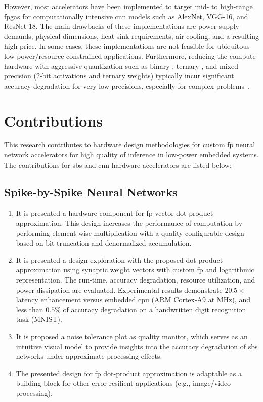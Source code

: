 \begin{itemize}
However, most accelerators have been implemented to target mid- to high-range \glspl{fpga} for computationally intensive \gls{cnn} models such as AlexNet, VGG-16, and ResNet-18. The main drawbacks of these implementations are power supply demands, physical dimensions, heat sink requirements, air cooling, and a resulting high price. In some cases, these implementations are not feasible for ubiquitous low-power/resource-constrained applications. Furthermore, reducing the compute hardware with aggressive quantization such as binary \cite{courbariaux2015binaryconnect}, ternary \cite{lin2015neural}, and mixed precision (2-bit activations and ternary weights) \cite{colangelo2018exploration} typically incur significant accuracy degradation for very low precisions, especially for complex problems~\cite{faraone2019addnet}.

\end{itemize}

\section{Contributions}
This research contributes to hardware design methodologies for custom \gls{fp} neural network accelerators for high quality of inference in
 low-power embedded systems. The contributions for \gls{sbs} and \gls{cnn} hardware accelerators are listed below:

\subsection{Spike-by-Spike Neural Networks}
\begin{enumerate}
	\item It is presented a hardware component for \gls{fp} vector dot-product approximation. This design increases the performance of computation by performing element-wise multiplication with a quality configurable design based on bit truncation and denormalized accumulation.
	\item It is presented a design exploration with the proposed dot-product approximation using synaptic weight vectors with custom \gls{fp} and logarithmic representation. The run-time, accuracy degradation, resource utilization, and power dissipation are evaluated. Experimental results demonstrate $20.5\times$ latency enhancement versus embedded \gls{cpu} (ARM Cortex-A9 at \unit[666]{MHz}), and less than $0.5\%$ of accuracy degradation on a handwritten digit recognition task (MNIST).
	\item It is proposed a noise tolerance plot as quality monitor, which serves as an intuitive visual model to provide insights into the accuracy degradation of \gls{sbs} networks under approximate processing effects.
	\item The presented design for \gls{fp} dot-product approximation is adaptable as a building block for other error resilient applications (e.g., image/video processing).
\end{enumerate}


